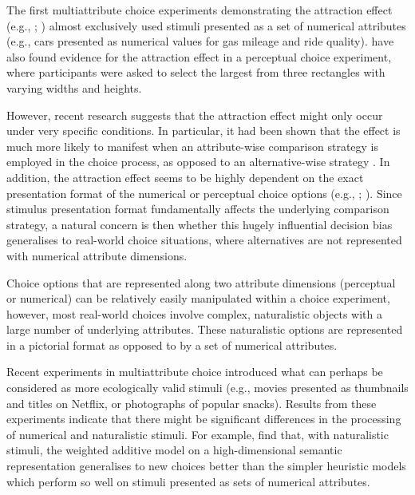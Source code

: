 \documentclass[12pt, a4paper]{article}
\begin{document}
The first multiattribute choice experiments demonstrating the attraction effect (e.g., ; ) almost exclusively used stimuli presented as a set of numerical attributes (e.g., cars presented as numerical values for gas mileage and ride quality).  have also found evidence for the attraction effect in a perceptual choice experiment, where participants were asked to select the largest from three rectangles with varying widths and heights. 


However, recent research suggests that the attraction effect might only occur under very specific conditions.
In particular, it had been shown that the effect is much more likely to manifest when an attribute-wise comparison strategy is employed in the choice process, as opposed to an alternative-wise strategy \cite{Noguchi2014a}. In addition, the attraction effect seems to be highly dependent on the exact presentation format of the numerical or perceptual choice options (e.g., ; ). Since stimulus presentation format fundamentally affects the underlying comparison strategy, a natural concern is then whether this hugely influential decision bias generalises to real-world choice situations, where alternatives are not represented with numerical attribute dimensions.  


Choice options that are represented along two attribute dimensions (perceptual or numerical) can be relatively easily manipulated within a choice experiment, however, most real-world choices involve complex, naturalistic objects with a large number of underlying attributes. 
These naturalistic options are represented in a pictorial format as opposed to by a set of numerical attributes.

 Recent experiments in multiattribute choice introduced what can perhaps be considered as more ecologically valid stimuli (e.g., movies presented as thumbnails and titles on Netflix, or photographs of popular snacks). Results from these experiments indicate that there might be significant differences in the processing of numerical and naturalistic stimuli. For example,  find that, with naturalistic stimuli, the weighted additive model on a high-dimensional semantic representation generalises to new choices better than the simpler heuristic models which perform so well on stimuli presented as sets of numerical attributes.
\end{document}
